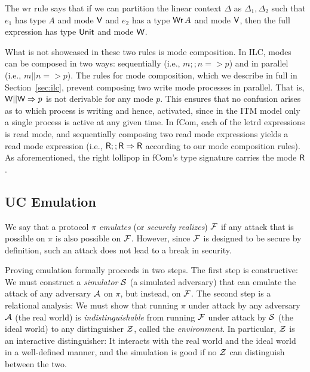 The wr rule says that if we can partition the linear context $\Delta$ as $\Delta_1, \Delta_2$
such that $e_1$ has type $A$ and mode $\textsf{V}$ and $e_2$ has a type $\text{\textsf{Wr}}\,A$ and
mode $\textsf{V}$, then the full expression has type $\text{\textsf{Unit}}$ and mode $\textsf{W}$.

What is not showcased in these two rules is mode composition. In ILC, modes can
be composed in two ways: sequentially (i.e., $m ;; n => p$) and in parallel
(i.e., $m || n => p$). The rules for mode composition, which we describe in full
in Section~\ref{sec:ilc}, prevent composing two write mode processes in
parallel. That is, $\textsf{W} || \textsf{W} => p$ is not derivable for any mode $p$. This
ensures that no confusion arises as to which process is writing and hence,
activated, since in the ITM model only a single process is active at any given
time. In \textsf{fCom}, each of the letrd expressions is read mode, and
sequentially composing two read mode expressions yields a read mode expression
(i.e., $\textsf{R} ;; \textsf{R} => \textsf{R}$ according to our mode composition rules). As
aforementioned, the right lollipop in \textsf{fCom}'s type signature carries the
mode $\textsf{R}$.

\subsection{UC Emulation}
\label{subsec:emulation}

We say that a protocol $\pi$ \emph{emulates} (or \emph{securely realizes})
$\mathcal{{F}}$ if any attack that is possible on $\pi$ is also possible on
$\mathcal{{F}}$. However, since $\mathcal{{F}}$ is designed to be secure by definition, such
an attack does not lead to a break in security.

Proving emulation formally proceeds in two steps. The first step is
constructive: We must construct a \emph{simulator} $\mathcal{{S}}$ (a simulated
adversary) that can emulate the attack of any adversary $\mathcal{{A}}$ on $\pi$, but
instead, on $\mathcal{{F}}$. The second step is a relational analysis: We must show
that running $\pi$ under attack by any adversary $\mathcal{{A}}$ (the real world) is
\emph{indistinguishable} from running $\mathcal{{F}}$ under attack by $\mathcal{{S}}$ (the
ideal world) to any distinguisher $\mathcal{{Z}}$, called the \emph{environment}. In
particular, $\mathcal{{Z}}$ is an interactive distinguisher: It interacts with the real
world and the ideal world in a well-defined manner, and the simulation is good
if no $\mathcal{{Z}}$ can distinguish between the two.

